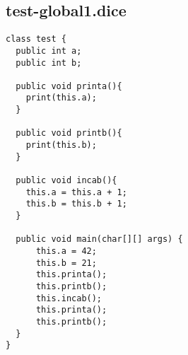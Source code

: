 \subsection{test-global1.dice}
\begin{verbatim}
class test {
  public int a;
  public int b;

  public void printa(){
    print(this.a);
  }

  public void printb(){
    print(this.b);
  }

  public void incab(){
    this.a = this.a + 1;
    this.b = this.b + 1;
  }

  public void main(char[][] args) {
      this.a = 42;
      this.b = 21;
      this.printa();
      this.printb();
      this.incab();
      this.printa();
      this.printb();
  }
}

\end{verbatim}